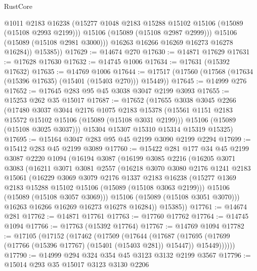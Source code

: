 \begin{lexlean}{RustCore}
\begin{coremodule}
                @1011
                @2183
                @16238
                (@15277 @1048 @2183 @15288 @15102 @15106 (@15089 (@15108 @2993 @2199)))
                @15106
                (@15089 (@15108 @2987 @2999)))
              @15106
              (@15089 (@15108 @2981 @3000)))
            @16263
            @16266
            @16269
            @16273
            @16278
            @16284))
        @15385))
@17629 := @14674 @270
@17630 := @14871 @17629
@17631 := @17628 @17630
@17632 := @14745 @1006
@17634 := @17631 (@15392 @17632)
@17635 := @14769 @1006
@17644 := @17517 (@17560 (@17568 (@17634 (@15396 @17635) (@15401 (@15403 @270))) @15449))
@17645 := @14999 @276
@17652 := @17645 @283 @95 @45 @3038 @3047 @2199 @3093
@17655 := @15253 @262 @35 @15017
@17687 := @17652
    (@17655
      @3038
      @3045
      @2266
      (@17480
        @3037
        @3044
        @2176
        @1075
        @2183
        @15378
        (@15561 @1151 @2183 @15572 @15102 @15106 (@15089 (@15108 @3031 @2199)))
        @15106
        (@15089 (@15108 @3025 @3037)))
      @15304
      @15307
      @15310
      @15314
      @15319
      @15325)
@17695 := @15164 @3047 @283 @95 @45 @2199 @3090 @2199 @2294
@17699 := @15412 @283 @45 @2199 @3089
@17760 := @15422
    @281
    @177
    @34
    @45
    @2199
    @3087
    @2220
    @1094
    (@16194
      @3087
      (@16199
        @3085
        @2216
        (@16205
          @3071
          @3083
          (@16211
            @3071
            @3081
            @2557
            (@16218
              @3070
              @3080
              @2176
              @1241
              @2183
              @15061
              (@16229
                @3069
                @3079
                @2176
                @1337
                @2183
                @16238
                (@15277 @1369 @2183 @15288 @15102 @15106 (@15089 (@15108 @3063 @2199)))
                @15106
                (@15089 (@15108 @3057 @3069)))
              @15106
              (@15089 (@15108 @3051 @3070)))
            @16263
            @16266
            @16269
            @16273
            @16278
            @16284))
        @15385))
@17761 := @14674 @281
@17762 := @14871 @17761
@17763 := @17760 @17762
@17764 := @14745 @1094
@17766 := @17763 (@15392 @17764)
@17767 := @14769 @1094
@17782 := @17105
    (@17152
      (@17462
        (@17509
          (@17644
            (@17687
              (@17695 (@17699 (@17766 (@15396 @17767) (@15401 (@15403 @281)) @15447)) @15449))))))
@17790 := @14999 @294 @324 @354 @45 @3123 @3132 @2199 @3567
@17796 := @15014 @293 @35 @15017 @3123 @3130 @2206

\end{coremodule}
\end{lexlean}
